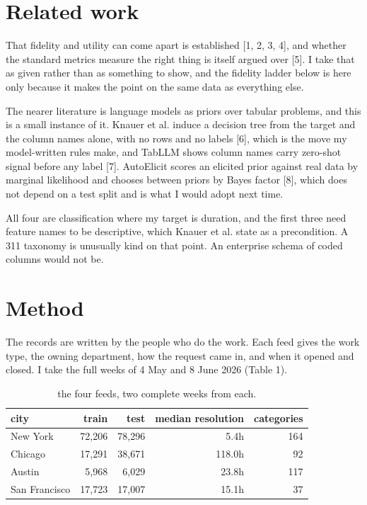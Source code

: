 \documentclass[10pt,a4paper,twocolumn]{article}
\begin{document}
\section*{Related work}

That fidelity and utility can come apart is established [1, 2, 3, 4], and whether
the standard metrics measure the right thing is itself argued over [5]. I take
that as given rather than as something to show, and the fidelity ladder below is
here only because it makes the point on the same data as everything else.

The nearer literature is language models as priors over tabular problems, and
this is a small instance of it. Knauer et al. induce a decision tree from the
target and the column names alone, with no rows and no labels [6], which is the
move my model-written rules make, and TabLLM shows column names carry zero-shot
signal before any label [7]. AutoElicit scores an elicited prior against real
data by marginal likelihood and chooses between priors by Bayes factor [8], which
does not depend on a test split and is what I would adopt next time.

All four are classification where my target is duration, and the first three need
feature names to be descriptive, which Knauer et al. state as a precondition. A
311 taxonomy is unusually kind on that point. An enterprise schema of coded
columns would not be.

\section*{Method}

The records are written by the people who do the work. Each feed gives the work
type, the owning department, how the request came in, and when it opened and
closed. I take the full weeks of 4 May and 8 June 2026 (Table 1).

\begin{table}[t]
\centering
\footnotesize
\begin{tabular}{lrrrr}
\toprule
city & train & test & median resolution & categories \\
\midrule
New York & 72,206 & 78,296 & 5.4h & 164 \\
Chicago & 17,291 & 38,671 & 118.0h & 92 \\
Austin & 5,968 & 6,029 & 23.8h & 117 \\
San Francisco & 17,723 & 17,007 & 15.1h & 37 \\
\bottomrule
\end{tabular}
\caption{the four feeds, two complete weeks from each.}
\end{table}
\end{document}

